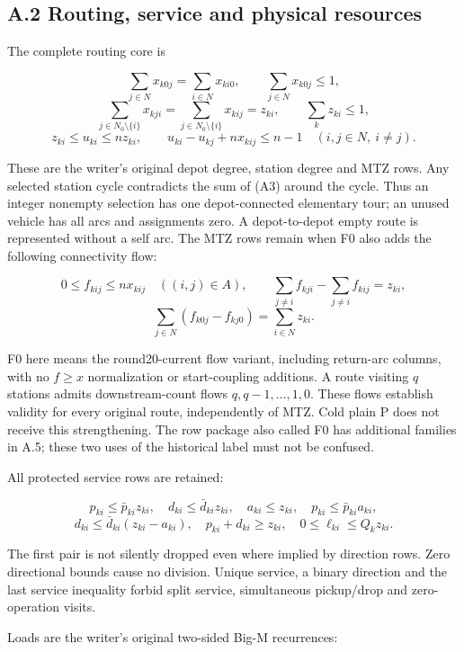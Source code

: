 \documentclass[
  american,
  11pt,
]{article}
\newcounter{none} %
\begin{document}
\subsection{A.2 Routing, service and physical
resources}\label{a.2-routing-service-and-physical-resources}

The complete routing core is

\[
\sum_{j\in N}x_{k0j}=\sum_{i\in N}x_{ki0},\qquad
\sum_{j\in N}x_{k0j}\le1,
\tag{A1}
\] \[
\sum_{j\in N_0\setminus\{i\}}x_{kji}
=\sum_{j\in N_0\setminus\{i\}}x_{kij}=z_{ki},\qquad
\sum_kz_{ki}\le1,
\tag{A2}
\] \[
z_{ki}\le u_{ki}\le nz_{ki},\qquad
u_{ki}-u_{kj}+nx_{kij}\le n-1
\quad(i,j\in N,\ i\ne j).
\tag{A3}
\]

These are the writer's original depot degree, station degree and MTZ
rows. Any selected station cycle contradicts the sum of (A3) around the
cycle. Thus an integer nonempty selection has one depot-connected
elementary tour; an unused vehicle has all arcs and assignments zero. A
depot-to-depot empty route is represented without a self arc. The MTZ
rows remain when F0 also adds the following connectivity flow:

\[
0\le f_{kij}\le n x_{kij}\quad((i,j)\in A),\qquad
\sum_{j\ne i}f_{kji}-\sum_{j\ne i}f_{kij}=z_{ki},
\tag{A4}
\] \[
\sum_{j\in N}(f_{k0j}-f_{kj0})=\sum_{i\in N}z_{ki}.
\]

F0 here means the round20-current flow variant, including return-arc
columns, with no \(f\ge x\) normalization or start-coupling additions. A
route visiting \(q\) stations admits downstream-count flows
\(q,q-1,\ldots,1,0\). These flows establish validity for every original
route, independently of MTZ. Cold plain P does not receive this
strengthening. The row package also called F0 has additional families in
A.5; these two uses of the historical label must not be confused.

All protected service rows are retained:

\[
p_{ki}\le\bar p_{ki}z_{ki},\quad d_{ki}\le\bar d_{ki}z_{ki},\quad
a_{ki}\le z_{ki},\quad p_{ki}\le\bar p_{ki}a_{ki},
\tag{A5}
\] \[
d_{ki}\le\bar d_{ki}(z_{ki}-a_{ki}),\quad
p_{ki}+d_{ki}\ge z_{ki},\quad
0\le\ell_{ki}\le Q_kz_{ki}.
\]

The first pair is not silently dropped even where implied by direction
rows. Zero directional bounds cause no division. Unique service, a
binary direction and the last service inequality forbid split service,
simultaneous pickup/drop and zero-operation visits.

Loads are the writer's original two-sided Big-M recurrences:
\end{document}
